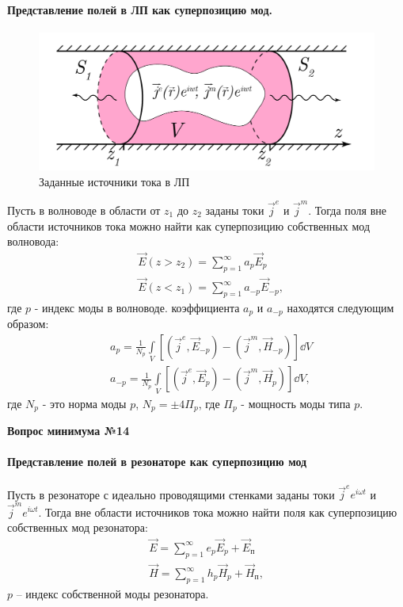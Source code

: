 \documentclass[a4paper,14pt]{extarticle}
\newcommand{\ticket}[1] {
\newpage
\hypertarget{num#1}{}
\begin{center}
	\textbf{Вопрос минимума №#1 }
\end{center}
}
\begin{document}
\paragraph{Представление полей в ЛП как суперпозицию мод.}
\begin{figure}[H]
	\centering
	\includegraphics[width=0.6\linewidth]{img/13.pdf}
	\caption{Заданные источники тока в ЛП} 
	\label{fig:figure13}
\end{figure}

Пусть в волноводе в области от $z_1$ до $z_2$ заданы токи $\vec{j}^e$ и $\vec{j}^m$. Тогда поля вне области источников тока можно найти как
суперпозицию собственных мод волновода:
\begin{align*}
	&\vec{E}(z>z_2) = \sum \limits_{p=1}^{\infty}a_p\vec{E}_p\\
	&\vec{E}(z<z_1) = \sum \limits_{p=1}^{\infty}a_{-p}\vec{E}_{-p}	,	
\end{align*}
где $p$ - индекс моды в волноводе. коэффициента $a_p$ и $a_{-p}$ находятся следующим образом:
\begin{align*}
	&a_p = \frac{1}{N_p}\int\limits_V\left[ (\vec{j}^e,\vec{E}_{-p})-(\vec{j}^m,\vec{H}_{-p}) \right]\dd V\\
	&a_{-p} = \frac{1}{N_p}\int\limits_V\left[ (\vec{j}^e,\vec{E}_{p})-(\vec{j}^m,\vec{H}_{p}) \right]\dd V,
\end{align*}
где $N_p$ - это норма моды $p$, $N_p=\pm4\Pi_p$, где $\Pi_p$ - мощность моды типа $p$.


\ticket{14}
\paragraph{Представление полей в резонаторе как суперпозицию мод} %
Пусть в резонаторе с идеально проводящими стенками заданы токи $\vec j^e e^{i \omega t}$ и $\vec j^me^{i \omega t}$. Тогда вне области источников тока можно найти поля как суперпозицию собственных мод резонатора:
\begin{gather*}
	\vec E = \sum_{p=1}^{\infty} e_p \vec E_p   + \vec E_{\text{п}}  \\
	\vec H = \sum_{p=1}^{\infty} h_p \vec H_p + \vec H_{\text{п}},
\end{gather*}
$p$ -- индекс собственной моды резонатора.
\end{document}
